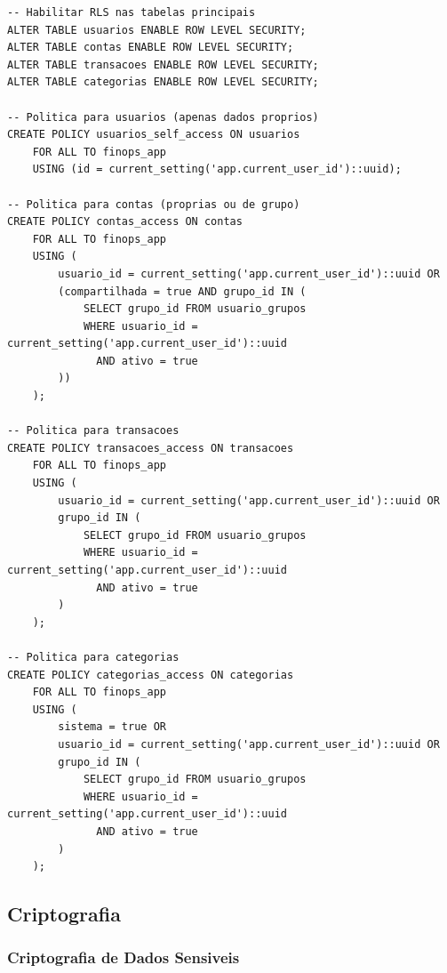 \begin{lstlisting}[caption=Politicas de seguranca por linha]
-- Habilitar RLS nas tabelas principais
ALTER TABLE usuarios ENABLE ROW LEVEL SECURITY;
ALTER TABLE contas ENABLE ROW LEVEL SECURITY;
ALTER TABLE transacoes ENABLE ROW LEVEL SECURITY;
ALTER TABLE categorias ENABLE ROW LEVEL SECURITY;

-- Politica para usuarios (apenas dados proprios)
CREATE POLICY usuarios_self_access ON usuarios
    FOR ALL TO finops_app
    USING (id = current_setting('app.current_user_id')::uuid);

-- Politica para contas (proprias ou de grupo)
CREATE POLICY contas_access ON contas
    FOR ALL TO finops_app
    USING (
        usuario_id = current_setting('app.current_user_id')::uuid OR
        (compartilhada = true AND grupo_id IN (
            SELECT grupo_id FROM usuario_grupos 
            WHERE usuario_id = current_setting('app.current_user_id')::uuid 
              AND ativo = true
        ))
    );

-- Politica para transacoes
CREATE POLICY transacoes_access ON transacoes
    FOR ALL TO finops_app
    USING (
        usuario_id = current_setting('app.current_user_id')::uuid OR
        grupo_id IN (
            SELECT grupo_id FROM usuario_grupos 
            WHERE usuario_id = current_setting('app.current_user_id')::uuid 
              AND ativo = true
        )
    );

-- Politica para categorias
CREATE POLICY categorias_access ON categorias
    FOR ALL TO finops_app
    USING (
        sistema = true OR
        usuario_id = current_setting('app.current_user_id')::uuid OR
        grupo_id IN (
            SELECT grupo_id FROM usuario_grupos 
            WHERE usuario_id = current_setting('app.current_user_id')::uuid 
              AND ativo = true
        )
    );
\end{lstlisting}

\subsection{Criptografia}

\subsubsection{Criptografia de Dados Sensiveis}

